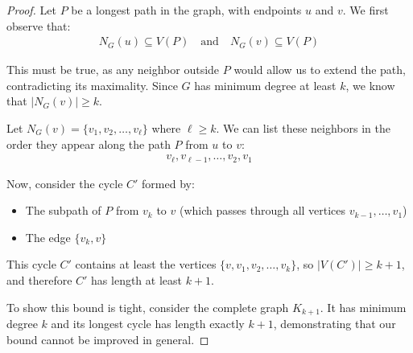 \documentclass{article}
\theoremstyle{definition}
\begin{document}
\begin{proof}
    Let $P$ be a longest path in the graph, with endpoints $u$ and $v$. We first observe that:
    \begin{align}
        N_G(u) \subseteq V(P) \quad \text{and} \quad N_G(v) \subseteq V(P)
    \end{align}
    
    This must be true, as any neighbor outside $P$ would allow us to extend the path, contradicting its maximality. Since $G$ has minimum degree at least $k$, we know that $|N_G(v)| \geq k$.
    
    Let $N_G(v) = \{v_1, v_2, \ldots, v_\ell\}$ where $\ell \geq k$. We can list these neighbors in the order they appear along the path $P$ from $u$ to $v$:
    \begin{align}
        v_\ell, v_{\ell-1}, \ldots, v_2, v_1
    \end{align}
    
    Now, consider the cycle $C'$ formed by:
    \begin{itemize}
        \item The subpath of $P$ from $v_k$ to $v$ (which passes through all vertices $v_{k-1}, \ldots, v_1$)
        \item The edge $\{v_k, v\}$
    \end{itemize}
    
    This cycle $C'$ contains at least the vertices $\{v, v_1, v_2, \ldots, v_k\}$, so $|V(C')| \geq k + 1$, and therefore $C'$ has length at least $k + 1$.
    
    To show this bound is tight, consider the complete graph $K_{k+1}$. It has minimum degree $k$ and its longest cycle has length exactly $k+1$, demonstrating that our bound cannot be improved in general.
\end{proof}
\end{document}
